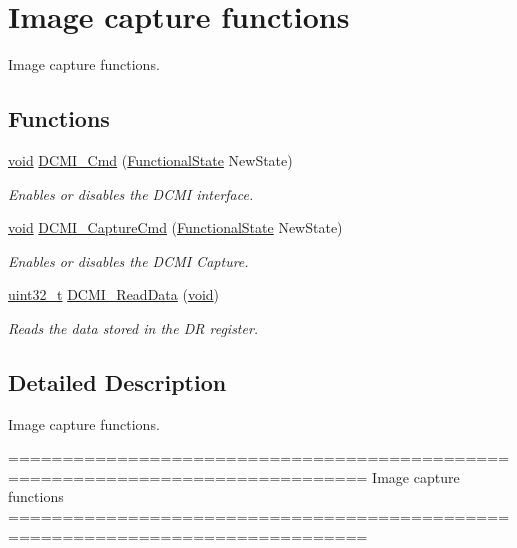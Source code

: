 \hypertarget{group___d_c_m_i___group2}{\section{Image capture functions}
\label{group___d_c_m_i___group2}
}


Image capture functions.  


\subsection*{Functions}
\begin{DoxyCompactItemize}
\item 
\hyperlink{group___n_a_m_e_ga18028b8badbf1ea7e704ccac3c488e82}{void} \hyperlink{group___d_c_m_i___group2_ga36bba54c40637b8071aea8ffea71fb84}{D\-C\-M\-I\-\_\-\-Cmd} (\hyperlink{group___exported__types_gac9a7e9a35d2513ec15c3b537aaa4fba1}{Functional\-State} New\-State)
\begin{DoxyCompactList}\small\item\em Enables or disables the D\-C\-M\-I interface. \end{DoxyCompactList}\item 
\hyperlink{group___n_a_m_e_ga18028b8badbf1ea7e704ccac3c488e82}{void} \hyperlink{group___d_c_m_i___group2_gad00fb33497ffa337a5b2b77fc6aa8d74}{D\-C\-M\-I\-\_\-\-Capture\-Cmd} (\hyperlink{group___exported__types_gac9a7e9a35d2513ec15c3b537aaa4fba1}{Functional\-State} New\-State)
\begin{DoxyCompactList}\small\item\em Enables or disables the D\-C\-M\-I Capture. \end{DoxyCompactList}\item 
\hyperlink{stdint_8h_a435d1572bf3f880d55459d9805097f62}{uint32\-\_\-t} \hyperlink{group___d_c_m_i___group2_ga475305bd8694e4cebefcb263c0a5b979}{D\-C\-M\-I\-\_\-\-Read\-Data} (\hyperlink{group___n_a_m_e_ga18028b8badbf1ea7e704ccac3c488e82}{void})
\begin{DoxyCompactList}\small\item\em Reads the data stored in the D\-R register. \end{DoxyCompactList}\end{DoxyCompactItemize}


\subsection{Detailed Description}
Image capture functions. \begin{DoxyVerb} ===============================================================================
                                 Image capture functions
 ===============================================================================  \end{DoxyVerb}
 


